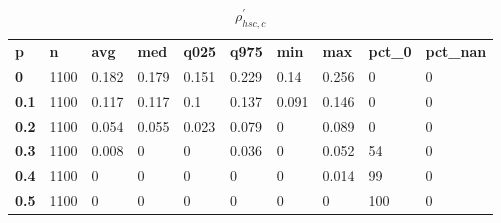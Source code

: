 \begin{table}[h]
 \centering 
\footnotesize
\caption{$\rho_{hsc,c}^\prime $}
\label{tab:alphahscc}
\begin{tabular}[h]{| l l l l l l l l l l|
    } \hline
\textbf{ p} & \textbf{ n} & \textbf{ avg} & \textbf{ med} & \textbf{ q025} & \textbf{ q975} & \textbf{ min} & \textbf{ max} & \textbf{ pct\_0} & \textbf{ pct\_nan}
           \\
  \textbf{  0} & 1100 & 0.182 & 0.179 & 0.151 & 0.229 &  0.14 & 0.256 &   0 & 0
           \\
  \textbf{0.1} & 1100 & 0.117 & 0.117 &   0.1 & 0.137 & 0.091 & 0.146 &   0 & 0
           \\
  \textbf{0.2} & 1100 & 0.054 & 0.055 & 0.023 & 0.079 &     0 & 0.089 &   0 & 0
           \\
  \textbf{0.3} & 1100 & 0.008 &     0 &     0 & 0.036 &     0 & 0.052 &  54 & 0
           \\
  \textbf{0.4} & 1100 &     0 &     0 &     0 &     0 &     0 & 0.014 &  99 & 0
           \\
  \textbf{0.5} & 1100 &     0 &     0 &     0 &     0 &     0 &     0 & 100 & 0
           \\
 \hline \end{tabular}
 \end{table}
